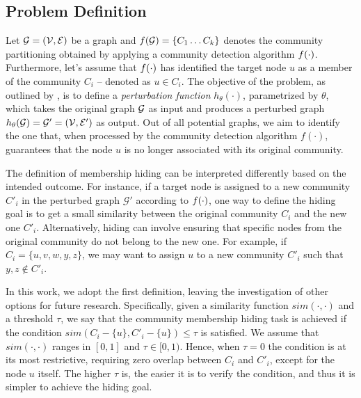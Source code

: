 \subsection{Problem Definition}
Let $\mathcal{G} = (\mathcal{V},\mathcal{E})$ be a graph and $f(\mathcal{G}) = \{C_1 \dots C_k\}$ denotes the community partitioning obtained by applying a community detection algorithm $f(\cdot)$. Furthermore, let's assume that $f(\cdot)$ has identified the target node $u$ as a member of the community $C_i$ -- denoted as $u \in C_i$. The objective of the problem, as outlined by \citet{bernini2024kdd}, is to define a \textit{perturbation function} $h_{\theta}(\cdot)$, parametrized by $\theta$, which takes the original graph $\mathcal{G}$ as input and produces a perturbed graph $h_{\theta}(\mathcal{G}) = \mathcal{G}' = (\mathcal{V}, \mathcal{E}')$ as output. Out of all potential graphs, we aim to identify the one that, when processed by the community detection algorithm $f(\cdot)$, guarantees that the node $u$ is no longer associated with its original community. 
 
The definition of membership hiding can be interpreted differently based on the intended outcome. For instance, if a target node is assigned to a new community $C'_i$ in the perturbed graph $\mathcal{G}'$ according to $f(\cdot)$, one way to define the hiding goal is to get a small similarity between the original community $C_i$ and the new one $C'_i$. Alternatively, hiding can involve ensuring that specific nodes from the original community do not belong to the new one. For example, if $C_i = \{ u,v,w,y,z \}$, we may want to assign $u$ to a new community $C'_i$ such that $y,z \notin C'_i$.
 
In this work, we adopt the first definition, leaving the investigation of other options for future research. Specifically, given a similarity function  $sim(\cdot,\cdot)$ and a threshold $\tau$, we say that the community membership hiding task is achieved if the condition $sim(C_i - \{u\}, C'_i - \{u\})  \leq \tau$ is satisfied. We assume that $sim(\cdot,\cdot)$ ranges in $[0,1]$ and $\tau \in [0,1)$. Hence, when $ \tau = 0 $ the condition is at its most restrictive, requiring zero overlap between $C_i$ and $C'_i$, except for the node $u$ itself. The higher $\tau$ is, the easier it is to verify the condition, and thus it is simpler to achieve the hiding goal.
 
